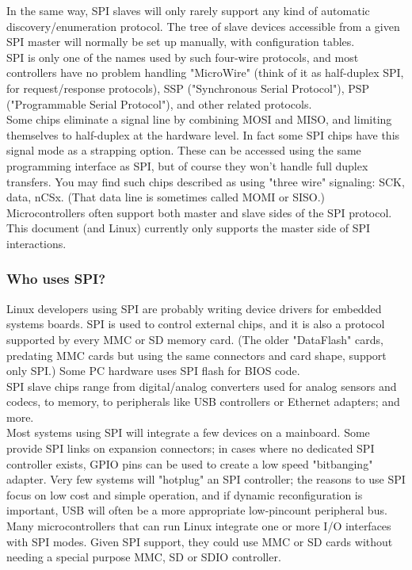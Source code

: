 In the same way, SPI slaves will only rarely support any kind of automatic discovery/enumeration protocol.  The tree of slave devices accessible from a given SPI master will normally be set up manually, with configuration tables.\\
SPI is only one of the names used by such four-wire protocols, and most controllers have no problem handling "MicroWire" (think of it as half-duplex SPI, for request/response protocols), SSP ("Synchronous Serial Protocol"), PSP ("Programmable Serial Protocol"), and other related protocols.\\
Some chips eliminate a signal line by combining MOSI and MISO, and limiting themselves to half-duplex at the hardware level. In fact some SPI chips have this signal mode as a strapping option.  These can be accessed using the same programming interface as SPI, but of course they won't handle full duplex transfers.  You may find such chips described as using "three wire" signaling: SCK, data, nCSx. (That data line is sometimes called MOMI or SISO.) \\
Microcontrollers often support both master and slave sides of the SPI protocol.  This document (and Linux) currently only supports the master side of SPI interactions.
\subsubsection{Who uses SPI?}
Linux developers using SPI are probably writing device drivers for embedded systems boards.  SPI is used to control external chips, and it is also a protocol supported by every MMC or SD memory card.  (The older "DataFlash" cards, predating MMC cards but using the same connectors and card shape, support only SPI.)  Some PC hardware uses SPI flash for BIOS code. \\
SPI slave chips range from digital/analog converters used for analog sensors and codecs, to memory, to peripherals like USB controllers or Ethernet adapters; and more. \\
Most systems using SPI will integrate a few devices on a mainboard. Some provide SPI links on expansion connectors; in cases where no dedicated SPI controller exists, GPIO pins can be used to create a low speed "bitbanging" adapter.  Very few systems will "hotplug" an SPI controller; the reasons to use SPI focus on low cost and simple operation, and if dynamic reconfiguration is important, USB will often be a more appropriate low-pincount peripheral bus. \\
Many microcontrollers that can run Linux integrate one or more I/O interfaces with SPI modes. Given SPI support, they could use MMC or SD cards without needing a special purpose MMC, SD or SDIO controller.
